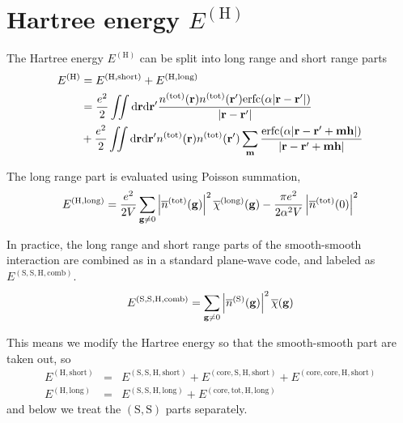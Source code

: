 \documentclass[paper=a4, fontsize=11pt]{article} %
\numberwithin{equation}{section} %
\numberwithin{figure}{section} %
\numberwithin{table}{section} %
\newcommand{\ol}{\overline}
\newcommand{\bh}{{\bf{h}}}
\newcommand{\bm}{{\bf{m}}}
\newcommand{\bg}{{\bf{g}}}
\newcommand{\br}{{\bf{r}}}
\newcommand{\rS}{{\mathrm{S}}}
\newcommand{\rcore}{{\mathrm{core}}}
\newcommand{\rshort}{{\mathrm{short}}}
\newcommand{\rlong}{{\mathrm{long}}}
\newcommand{\rerfc}{{\mathrm{erfc}}}
\newcommand{\rd}{{\mathrm{d}}}
\newcommand{\rH}{{\mathrm{H}}}
\newcommand{\rcomb}{{\mathrm{comb}}}
\newcommand{\rtot}{{\mathrm{tot}}}
\begin{document}
\newpage
\section{Hartree energy $E^{(\rH)}$}

The Hartree energy $E^{(\rH)}$ can be split into long range and short range parts
\begin{equation}
\begin{split}
E^{(\rH)}
&=E^{(\rH,\rshort)} + E^{(\rH,\rlong)}\\
&=\frac{e^2}{2}\iint \rd\br \rd\br'\frac{n^{(\rtot)}(\br)n^{(\rtot)}(\br')\rerfc(\alpha|\br-\br'|)}{|\br-\br'|} \\
&+ \frac{e^2}{2}\iint \rd\br \rd\br' n^{(\rtot)}(\br)n^{(\rtot)}(\br')\sum_\bm \frac{\rerfc(\alpha|\br-\br'+\bm\bh|)}{|\br-\br'+\bm\bh|}\\
\end{split}
\end{equation}

The long range part is evaluated using Poisson summation,
\begin{equation}
\begin{split}
E^{(\rH,\rlong)}
&= \frac{e^2}{2V}\sum_{\bg \neq 0} \left|\ol n^{(\rtot)}(\bg)\right|^2 \ol \chi^{(\rlong)}(\bg) -\frac{ \pi e^2}{2 \alpha^2 V} \left|\ol n^{(\rtot)}(0)\right|^2\\
\end{split}
\end{equation}

In practice, the long range and short range parts of the smooth-smooth interaction are combined as in a standard plane-wave code, and labeled as $E^{(\rS,\rS,\rH,\rcomb)}$.
\begin{equation}
E^{(\rS,\rS,\rH,\rcomb)}
= \sum_{\bg \neq 0} \left|\ol n^{(\rS)}(\bg)\right|^2 \ol \chi(\bg) 
\end{equation}

This means we modify the Hartree energy so that the smooth-smooth part are taken out, so
\begin{eqnarray}
E^{(\rH,\rshort)} &=& E^{(\rS,\rS,\rH,\rshort)} + E^{(\rcore,\rS,\rH,\rshort)}+E^{(\rcore,\rcore,\rH,\rshort)} \\
E^{(\rH,\rlong)} &=& E^{(\rS,\rS,\rH,\rlong)} + E^{(\rcore,\rtot,\rH,\rlong)}
\end{eqnarray}
and below we treat the $(\rS,\rS)$ parts separately. \\
\end{document}
